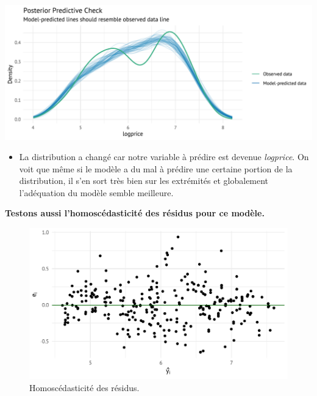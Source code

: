 \documentclass[
  12pt,
]{report}
\providecommand{\tightlist}{%
  \setlength{\itemsep}{0pt}\setlength{\parskip}{0pt}}\usepackage{longtable,booktabs,array}
\begin{document}
\begin{center}
\includegraphics{report_files/figure-pdf/posterior_log-1.pdf}
\end{center}

\begin{itemize}
\tightlist
\item
  La distribution a changé car notre variable à prédire est devenue
  \emph{logprice}. On voit que même si le modèle a du mal à prédire une
  certaine portion de la distribution, il s'en sort très bien sur les
  extrémités et globalement l'adéquation du modèle semble meilleure.
\end{itemize}

\newpage

\textbf{Testons aussi l'homoscédasticité des résidus pour ce modèle.}

\begin{figure}[H]

{\centering \includegraphics{report_files/figure-pdf/log_hetero-1.pdf}

}

\caption{Homoscédasticité des résidus.}

\end{figure}%
\end{document}
